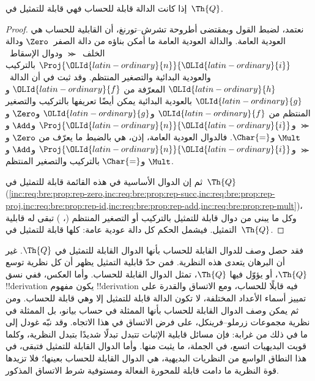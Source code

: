 \documentclass[../../../include/open-logic-section]{subfiles}
\begin{document}

\begin{thm}
إذا كانت الدالة قابلة للحساب فهي قابلة للتمثيل في~$\Th{Q}$.
\end{thm}

\begin{proof}
نعتمد، لضبط القول وبمقتضى أطروحة تشرش--تورنغ، أن القابلية للحساب
هي العودية العامة. والدالة العودية العامة ما أمكن بناؤه من دالة
الصفر~$\Zero$ ودالة الخلف~$\Succ$ ودوال الإسقاط~$\Proj{\OLId{latin-ordinary}{n}}{\OLId{latin-ordinary}{i}}$
بالتركيب والعودية البدائية والتصغير المنتظم.
وقد ثبت في  أن الدالة~$\OLId{latin-ordinary}{h}$
المعرّفة من $\OLId{latin-ordinary}{f}$ و$\OLId{latin-ordinary}{g}$ بالعودية البدائية يمكن أيضًا تعريفها بالتركيب
والتصغير المنتظم من $\OLId{latin-ordinary}{f}$ و$\OLId{latin-ordinary}{g}$ و$\Zero$ و$\Succ$ و$\Proj{\OLId{latin-ordinary}{n}}{\OLId{latin-ordinary}{i}}$
و$\Add$ و$\Mult$ و$\Char{=}$.
فالدوال العودية العامة، إذن، هي بالضبط ما يعرّف من
$\Zero$ و$\Succ$ و$\Proj{\OLId{latin-ordinary}{n}}{\OLId{latin-ordinary}{i}}$ و$\Add$ و$\Mult$ و$\Char{=}$
بالتركيب والتصغير المنتظم.

ثم إن الدوال الأساسية في هذه القائمة قابلة للتمثيل في~$\Th{Q}$
(\cref{inc:req:bre:prop:rep-zero,inc:req:bre:prop:rep-succ,inc:req:bre:prop:rep-proj,inc:req:bre:prop:rep-id,inc:req:bre:prop:rep-add,inc:req:bre:prop:rep-mult})،
وكل ما يبنى من دوال قابلة للتمثيل بالتركيب أو التصغير المنتظم
(،
) تبقى له قابلية التمثيل.
فيشمل الحكم كل دالة عودية عامة: كلها قابلة للتمثيل في~$\Th{Q}$.
\end{proof}

\begin{explain}
فقد حصل وصف للدوال القابلة للحساب بأنها الدوال القابلة للتمثيل في
$\Th{Q}$. غير أن البرهان يتعدى هذه النظرية. فمن حدّ قابلية التمثيل
يظهر أن كل نظرية توسع $\Th{Q}$، أو يؤوّل فيها $\Th{Q}$، تمثل
الدوال القابلة للحساب.
وأما العكس، ففي نسق !!{derivation} يكون مفهوم !!{derivation} فيه
قابلًا للحساب، ومع الاتساق والقدرة على تمييز أسماء الأعداد المختلفة،
لا تكون الدالة قابلة للتمثيل إلا وهي قابلة للحساب.
ومن ثم يمكن وصف الدوال القابلة للحساب بأنها الممثلة في حساب بيانو،
بل الممثلة في نظرية مجموعات زرملو--فرينكل، على فرض الاتساق في هذا الاتجاه.
وقد نبّه غودل إلى ما في ذلك من غرابة: فإن مسائل قابلية الإثبات تتبدل
تبدلًا شديدًا بتبدل النظرية، وكلما قويت البديهيات اتسع، في الجملة، ما
يثبت منها. وأما الدوال القابلة للتمثيل فتبقى، في هذا النطاق الواسع من
النظريات البديهية، هي الدوال القابلة للحساب بعينها؛ فلا تزيدها قوة النظرية
ما دامت قابلة للمحورة الفعالة ومستوفية شرط الاتساق المذكور.
\end{explain}
\end{document}
